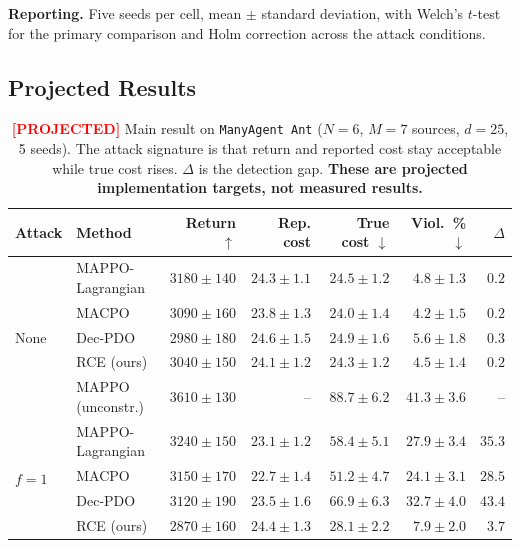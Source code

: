 \documentclass{article}
\newcommand{\projected}{\textcolor{red}{\textbf{[PROJECTED]}}}
\begin{document}
\textbf{Reporting.} Five seeds per cell, mean $\pm$ standard deviation, with Welch's $t$-test for the primary comparison and Holm correction across the attack conditions.

\subsection{Projected Results}

\begin{table}[t]
\caption{\projected{} Main result on \texttt{ManyAgent Ant} ($N=6$, $M=7$ sources, $d=25$, 5 seeds). The attack signature is that return and reported cost stay acceptable while true cost rises. $\Delta$ is the detection gap. \textbf{These are projected implementation targets, not measured results.}}
\label{tab:main}
\centering
\footnotesize
\begin{tabular}{@{}llrrrrr@{}}
\toprule
\textbf{Attack} & \textbf{Method} & \textbf{Return} $\uparrow$ & \textbf{Rep. cost} & \textbf{True cost} $\downarrow$ & \textbf{Viol.\ \%} $\downarrow$ & $\Delta$ \\
\midrule
\multirow{5}{*}{None}
 & MAPPO-Lagrangian & $3180 \pm 140$ & $24.3 \pm 1.1$ & $24.5 \pm 1.2$ & $4.8 \pm 1.3$ & $0.2$ \\
 & MACPO            & $3090 \pm 160$ & $23.8 \pm 1.3$ & $24.0 \pm 1.4$ & $4.2 \pm 1.5$ & $0.2$ \\
 & Dec-PDO          & $2980 \pm 180$ & $24.6 \pm 1.5$ & $24.9 \pm 1.6$ & $5.6 \pm 1.8$ & $0.3$ \\
 & RCE (ours)       & $3040 \pm 150$ & $24.1 \pm 1.2$ & $24.3 \pm 1.2$ & $4.5 \pm 1.4$ & $0.2$ \\
 & MAPPO (unconstr.)& $3610 \pm 130$ & --             & $88.7 \pm 6.2$ & $41.3 \pm 3.6$ & -- \\
\midrule
\multirow{4}{*}{$f{=}1$}
 & MAPPO-Lagrangian & $3240 \pm 150$ & $23.1 \pm 1.2$ & $58.4 \pm 5.1$ & $27.9 \pm 3.4$ & $35.3$ \\
 & MACPO            & $3150 \pm 170$ & $22.7 \pm 1.4$ & $51.2 \pm 4.7$ & $24.1 \pm 3.1$ & $28.5$ \\
 & Dec-PDO          & $3120 \pm 190$ & $23.5 \pm 1.6$ & $66.9 \pm 6.3$ & $32.7 \pm 4.0$ & $43.4$ \\
 & RCE (ours)       & $2870 \pm 160$ & $24.4 \pm 1.3$ & $28.1 \pm 2.2$ & $7.9 \pm 2.0$  & $3.7$ \\

\end{tabular}
\end{table}
\end{document}
